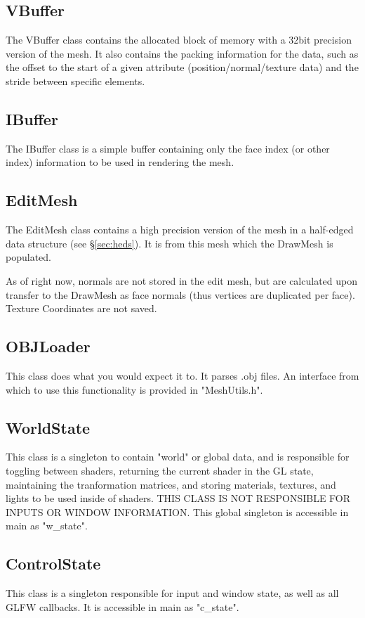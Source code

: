 \documentclass{article}
\begin{document}
\subsection{VBuffer}
The VBuffer class contains the allocated block of memory with a 32bit precision version of the mesh. It also contains the packing information for the data, such as the offset to the start of a given attribute (position/normal/texture data) and the stride between specific elements.

\subsection{IBuffer}
The IBuffer class is a simple buffer containing only the face index (or other index) information to be used in rendering the mesh.

\subsection{EditMesh}
The EditMesh class contains a high precision version of the mesh in a half-edged data structure (see \S\ref{sec:heds}). It is from this mesh which the DrawMesh is populated.

As of right now, normals are not stored in the edit mesh, but are calculated upon transfer to the DrawMesh as face normals (thus vertices are duplicated per face). Texture Coordinates are not saved.

\subsection{OBJLoader}
This class does what you would expect it to. It parses .obj files. An interface from which to use this functionality is provided in "MeshUtils.h".

\subsection{WorldState}
This class is a singleton to contain "world" or global data, and is responsible for toggling between shaders, returning the current shader in the GL state, maintaining the tranformation matrices, and storing materials, textures, and lights to be used inside of shaders. THIS CLASS IS NOT RESPONSIBLE FOR INPUTS OR WINDOW INFORMATION. This global singleton is accessible in main as "w\_state".

\subsection{ControlState}
This class is a singleton responsible for input and window state, as well as all GLFW callbacks. It is accessible in main as "c\_state".
\end{document}
